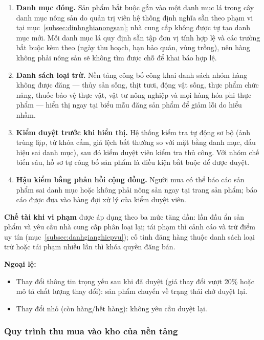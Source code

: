 \begin{enumerate}
    \item[\textbf{L1.}] \textbf{Danh mục đóng.} Sản phẩm bắt buộc gắn vào một danh mục lá trong cây danh mục nông sản do quản trị viên hệ thống định nghĩa sẵn theo phạm vi tại mục~\ref{subsec:dinhnghianongsan}; nhà cung cấp không được tự tạo danh mục mới. Mỗi danh mục lá quy định sẵn tập đơn vị tính hợp lệ và các trường bắt buộc kèm theo (ngày thu hoạch, hạn bảo quản, vùng trồng), nên hàng không phải nông sản sẽ không tìm được chỗ để khai báo hợp lệ.
    \item[\textbf{L2.}] \textbf{Danh sách loại trừ.} Nền tảng công bố công khai danh sách nhóm hàng không được đăng --- thủy sản sống, thịt tươi, động vật sống, thực phẩm chức năng, thuốc bảo vệ thực vật, vật tư nông nghiệp và mọi hàng hóa phi thực phẩm --- hiển thị ngay tại biểu mẫu đăng sản phẩm để giảm lỗi do hiểu nhầm.
    \item[\textbf{L3.}] \textbf{Kiểm duyệt trước khi hiển thị.} Hệ thống kiểm tra tự động sơ bộ (ảnh trùng lặp, từ khóa cấm, giá lệch bất thường so với mặt bằng danh mục, dấu hiệu sai danh mục), sau đó kiểm duyệt viên kiểm tra thủ công. Với nhóm chế biến sâu, hồ sơ tự công bố sản phẩm là điều kiện bắt buộc để được duyệt.
    \item[\textbf{L4.}] \textbf{Hậu kiểm bằng phản hồi cộng đồng.} Người mua có thể báo cáo sản phẩm sai danh mục hoặc không phải nông sản ngay tại trang sản phẩm; báo cáo được đưa vào hàng đợi xử lý của kiểm duyệt viên.
\end{enumerate}

\noindent\textbf{Chế tài khi vi phạm} được áp dụng theo ba mức tăng dần: lần đầu ẩn sản phẩm và yêu cầu nhà cung cấp phân loại lại; tái phạm thì cảnh cáo và trừ điểm uy tín (mục~\ref{subsec:danhgianghiepvu}); cố tình đăng hàng thuộc danh sách loại trừ hoặc tái phạm nhiều lần thì khóa quyền đăng bán.

\noindent\textbf{Ngoại lệ:}
\begin{itemize}
    \item Thay đổi thông tin trọng yếu sau khi đã duyệt (giá thay đổi vượt 20\% hoặc mô tả chất lượng thay đổi): sản phẩm chuyển về trạng thái chờ duyệt lại.
    \item Thay đổi nhỏ (còn hàng/hết hàng): không yêu cầu duyệt lại.
\end{itemize}

\subsubsection*{Quy trình thu mua vào kho của nền tảng}

